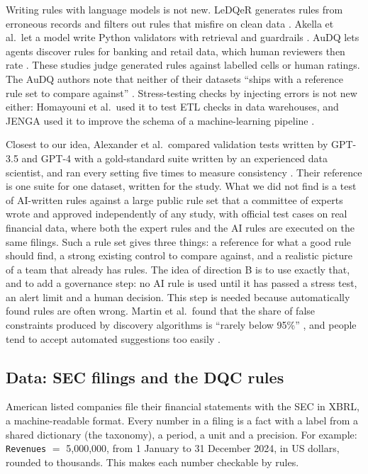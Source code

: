 \documentclass[11pt,a4paper]{article}
\begin{document}
Writing rules with language models is not new. LeDQeR generates rules from erroneous records and filters out rules that misfire on clean data \cite{ledqer}. Akella et al.\ let a model write Python validators with retrieval and guardrails \cite{akella}. AuDQ lets agents discover rules for banking and retail data, which human reviewers then rate \cite{audq}. These studies judge generated rules against labelled cells or human ratings. The AuDQ authors note that neither of their datasets ``ships with a reference rule set to compare against'' \cite{audq}. Stress-testing checks by injecting errors is not new either: Homayouni et al.\ used it to test ETL checks in data warehouses, and JENGA used it to improve the schema of a machine-learning pipeline \cite{homayouni,jenga}.

Closest to our idea, Alexander et al.\ compared validation tests written by GPT-3.5 and GPT-4 with a gold-standard suite written by an experienced data scientist, and ran every setting five times to measure consistency \cite{alexander}. Their reference is one suite for one dataset, written for the study. What we did not find is a test of AI-written rules against a large public rule set that a committee of experts wrote and approved independently of any study, with official test cases on real financial data, where both the expert rules and the AI rules are executed on the same filings. Such a rule set gives three things: a reference for what a good rule should find, a strong existing control to compare against, and a realistic picture of a team that already has rules. The idea of direction B is to use exactly that, and to add a governance step: no AI rule is used until it has passed a stress test, an alert limit and a human decision. This step is needed because automatically found rules are often wrong. Martin et al.\ found that the share of false constraints produced by discovery algorithms is ``rarely below 95\%'' \cite{martin}, and people tend to accept automated suggestions too easily \cite{parasuraman}.

\subsection{Data: SEC filings and the DQC rules}

American listed companies file their financial statements with the SEC in XBRL, a machine-readable format. Every number in a filing is a fact with a label from a shared dictionary (the taxonomy), a period, a unit and a precision. For example: \texttt{Revenues} $=$ 5{,}000{,}000, from 1 January to 31 December 2024, in US dollars, rounded to thousands. This makes each number checkable by rules.
\end{document}
